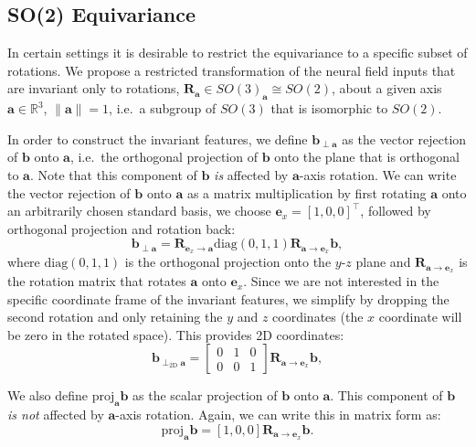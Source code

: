 \subsection{SO(2) Equivariance}\label{sec:SO2}

In certain settings it is desirable to restrict the equivariance to a specific subset of rotations. We propose a restricted transformation of the neural field inputs that are invariant only to rotations, $\mathbf{R}_{\mathbf{a}}\in SO(3)_{\mathbf{a}}\cong SO(2)$, about a given axis $\mathbf{a}\in\mathbb{R}^3$, $\|\mathbf{a}\|=1$, i.e.~a subgroup of $SO(3)$ that is isomorphic to $SO(2)$.

In order to construct the invariant features, we define $\mathbf{b}_{\perp\mathbf{a}}$ as the vector rejection of $\mathbf{b}$ onto $\mathbf{a}$, i.e.~the orthogonal projection of $\mathbf{b}$ onto the plane that is orthogonal to $\mathbf{a}$. Note that this component of $\mathbf{b}$ \emph{is} affected by $\mathbf{a}$-axis rotation. We can write the vector rejection of $\mathbf{b}$ onto $\mathbf{a}$ as a matrix multiplication by first rotating $\mathbf{a}$ onto an arbitrarily chosen standard basis, we choose $\mathbf{e}_x=[1,0,0]^\top$, followed by orthogonal projection and rotation back:
\begin{equation}
    \mathbf{b}_{\perp\mathbf{a}} = \mathbf{R}_{\mathbf{e}_x\rightarrow\mathbf{a}}\text{diag}(0,1,1)\mathbf{R}_{\mathbf{a}\rightarrow\mathbf{e}_x}\mathbf{b},
\end{equation}
where $\text{diag}(0,1,1)$ is the orthogonal projection onto the $y$-$z$ plane and $\mathbf{R}_{\mathbf{a}\rightarrow\mathbf{e}_x}$ is the rotation matrix that rotates $\mathbf{a}$ onto $\mathbf{e}_x$. Since we are not interested in the specific coordinate frame of the invariant features, we simplify by dropping the second rotation and only retaining the $y$ and $z$ coordinates (the $x$ coordinate will be zero in the rotated space). This provides 2D coordinates:
\begin{equation}
    \mathbf{b}_{\perp_\text{2D}\mathbf{a}} = \begin{bmatrix}
 0 & 1 & 0 \\
 0 & 0 & 1
 \end{bmatrix}\mathbf{R}_{\mathbf{a}\rightarrow\mathbf{e}_x}\mathbf{b},
\end{equation}

We also define $\text{proj}_\mathbf{a}\mathbf{b}$ as the scalar projection of $\mathbf{b}$ onto $\mathbf{a}$. This component of $\mathbf{b}$ \emph{is not} affected by $\mathbf{a}$-axis rotation. Again, we can write this in matrix form as:
\begin{equation}
    \text{proj}_\mathbf{a}\mathbf{b} = \left[1,0,0\right]\mathbf{R}_{\mathbf{a}\rightarrow\mathbf{e}_x}\mathbf{b}.
\end{equation}

